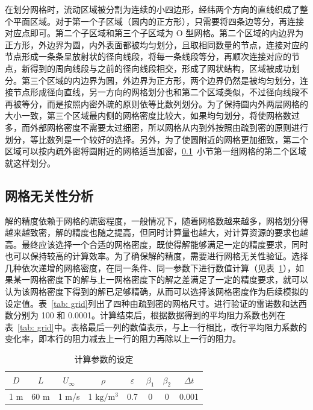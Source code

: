 在划分网格时，流动区域被分割为连续的小四边形，经纬两个方向的直线织成了整个平面区域。对于第一个子区域（圆内的正方形），只需要将四条边等分，再连接对应点即可。第二个子区域和第三个子区域为 O 型网格。第二个区域的内边界为正方形，外边界为圆，内外表面都被均匀划分，且取相同数量的节点，连接对应的节点形成一条条呈放射状的径向线段，将每一条线段等分，再顺次连接对应的节点，新得到的周向线段与之前的径向线段相交，形成了网状结构，区域被成功划分。第三个区域的内边界为圆，外边界为正方形，两个边界仍然是被均匀划分，连接节点形成径向直线，另一方向的网格划分也和第二个区域类似，不过径向线段不再被等分，而是按照内密外疏的原则依等比数列划分。为了保持圆内外两层网格的大小一致，第三个区域最内侧的网格密度比较大，如果均匀划分，将使网格数过多，而外部网格密度不需要太过细密，所以网格从内到外按照由疏到密的原则进行划分，等比数列是一个较好的选择。另外，为了使圆附近的网格更加细致，第二个区域可以按内疏外密将圆附近的网格适当加密，\ref{sec: grid-independent}~小节第一组网格的第二个区域就这样划分。

\subsection{网格无关性分析}\label{sec: grid-independent}

解的精度依赖于网格的疏密程度，一般情况下，随着网格数越来越多，网格划分得越来越致密，解的精度也随之提高，但同时计算量也越大，对计算资源的要求也越高。最终应该选择一个合适的网格密度，既使得解能够满足一定的精度要求，同时也可以保持较高的计算效率。为了确保解的精度，需要进行网格无关性验证。选择几种依次递增的网格密度，在同一条件、同一参数下进行数值计算（见表~\ref{tab: parameters}），如果某一网格密度下的解与上一网格密度下的解之差满足了一定的精度要求，就可以认为该网格密度下得到的解已足够精确，从而可以选择该网格密度作为后续模拟的设定值。表~\ref{tab: grid}列出了四种由疏到密的网格尺寸。进行验证的雷诺数和达西数分别为 100 和 0.0001。计算结束后，根据数据得到的平均阻力系数也列在表~\ref{tab: grid}中。表格最后一列的数值表示，与上一行相比，改行平均阻力系数的变化率，即本行的阻力减去上一行的阻力再除以上一行的阻力。

\begin{table}
	\caption{计算参数的设定}\label{tab: parameters}
	\vspace{.5em}\centering\wuhao
	\begin{tabular}{*{8}{c}}
		\toprule[1.5pt]
		$D$ & $L$ & $U_{\infty}$ & $\rho$ & $\varepsilon$ & $\beta_1$ & $\beta_2$ & $\Delta t$\\
		\midrule[1pt]
		1 m & 60 m & 1 m/s & 1 $\mathrm{kg}/\mathrm{m}^3$ & 0.7 & 0 & 0 & 0.001 \\
		\bottomrule[1.5pt]
	\end{tabular}
\end{table}

